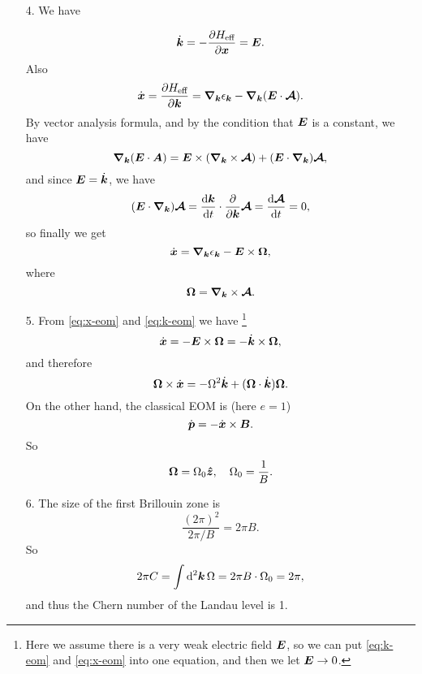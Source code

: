 \documentclass[hyperref, a4paper]{article}
\begin{document}
\begin{itemize}
\item[4.] We have 
\item[] \begin{equation}
    \dot{\vb*{k}} = - \pdv{H_{\text{eff}}}{\vb*{x}} = \vb*{E}.
    \label{eq:k-eom}
\end{equation}
Also
\[
    \dot{\vb*{x}} = \pdv{H_{\text{eff}}}{\vb*{k}} = \grad_{\vb*{k}} \epsilon_{\vb*{k}} - \grad_{\vb*{k}} (\vb*{E} \cdot \vb*{\mathcal{A}}).
\]
By vector analysis formula, and by the condition that $\vb*{E}$ is a constant,
we have 
\[
    \grad_{\vb*{k}} (\vb*{E} \cdot \mathcal{\vb*{A}}) = \vb*{E} \times (\grad_{\vb*{k}} \times \vb*{\mathcal{A}}) + (\vb*{E} \cdot \grad_{\vb*{k}}) \vb*{\mathcal{A}},
\]
and since $\vb*{E} = \dot{\vb*{k}}$, we have 
\[
    (\vb*{E} \cdot \grad_{\vb*{k}}) \vb*{\mathcal{A}}
    = \dv{\vb*{k}}{t} \cdot \pdv{\vb*{k}} \vb*{\mathcal{A}} = \dv{\vb*{\mathcal{A}}}{t} = 0,
\]
so finally we get
\begin{equation}
    \dot{\vb*{x}} = \grad_{\vb*{k}} \epsilon_{\vb*{k}} - \vb*{E} \times \vb*{\Omega},
    \label{eq:x-eom}
\end{equation}
where 
\begin{equation}
    \vb*{\Omega} = \grad_{\vb*{k}} \times \vb*{\mathcal{A}}.
\end{equation}


\item[5.] From \eqref{eq:x-eom} and \eqref{eq:k-eom} we have%
\footnote{
    Here we assume there is a very weak electric field $\vb*{E}$,
    so we can put \eqref{eq:k-eom} and \eqref{eq:x-eom} into one equation,
    and then we let $\vb*{E} \to 0$.
}
\[
    \dot{\vb*{x}} = - \vb*{E} \times \vb*{\Omega} = - \dot{\vb*{k}} \times \vb*{\Omega}, 
\]
and therefore 
\begin{equation}
    \vb*{\Omega} \times \dot{\vb*{x}} = - \Omega^2 \dot{\vb*{k}} + (\vb*{\Omega} \cdot \dot{\vb*{k}}) \vb*{\Omega}.
    \label{eq:eom-iqhe}
\end{equation}
On the other hand, the classical EOM is (here $e = 1$)
\begin{equation}
    \dot{\vb*{p}} = - \dot{\vb*{x}} \times \vb*{B}.
\end{equation}
So 
\begin{equation}
    \vb*{\Omega} = \Omega_0 \vu*{z}, \quad \Omega_0 = \frac{1}{B}.
\end{equation}

\item[6.] The size of the first Brillouin zone is 
\[
    \frac{(2\pi)^2}{2\pi / B} = 2\pi B.
\]
So 
\[
    2\pi C = \int \dd[2]{\vb*{k}} \Omega = 2\pi B \cdot \Omega_0 = 2\pi,
\]
and thus the Chern number of the Landau level is 1.

\end{itemize}
\end{document}
